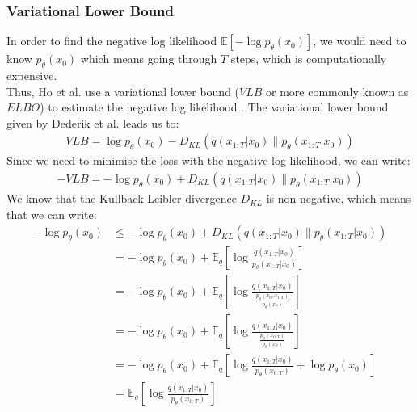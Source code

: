 \documentclass{article}
\begin{document}
\subsubsection{Variational Lower Bound}
In order to find the negative log likelihood $\mathbb{E}\left[- \log p_{\theta} \left(x_0\right)\right]$, we would need to know $p_{\theta} (x_0)$ which means going through $T$ steps, which is computationally expensive. \\
Thus, Ho et al. \cite{ho2020denoising} use a variational lower bound ($VLB$ or more commonly known as $ELBO$) to estimate the negative log likelihood \cite{ho2020denoising,sohldickstein2015deep}.
The variational lower bound given by Dederik et al. \cite{kingma2022autoencoding} leads us to:
\begin{gather}
  VLB = \log p_{\theta}\left(x_0\right) - D_{KL}\left(q\left(x_{1:T}|x_0\right) \| p_{\theta}\left(x_{1:T}|x_0\right)\right)
\end{gather}
Since we need to minimise the loss with the negative log likelihood, we can write:
\begin{gather}
  - VLB = - \log p_{\theta}\left(x_0\right) + D_{KL}\left(q\left(x_{1:T}|x_0\right) \| p_{\theta}\left(x_{1:T}|x_0\right)\right)
\end{gather}
We know that the Kullback-Leibler divergence $D_{KL}$ is non-negative, which means that we can write:
\begin{align}
  - \log p_{\theta}\left(x_0\right) &\leq - \log p_{\theta}\left(x_0\right) + D_{KL}\left(q\left(x_{1:T}|x_0\right) \| p_{\theta}\left(x_{1:T}|x_0\right)\right) \\[10pt]
  &= - \log p_{\theta}\left(x_0\right) + \mathbb{E}_q \left[\log \frac{q\left(x_{1:T}|x_0\right)}{p_{\theta}\left(x_{1:T}|x_0\right)}\right] \\[10pt]
  &= - \log p_{\theta}\left(x_0\right) + \mathbb{E}_q \left[\log \frac{q\left(x_{1:T}|x_0\right)}{\frac{p_{\theta}\left(x_0, x_{1:T}\right)}{p_{\theta}\left(x_0\right)}}\right] \\[10pt]
  &= - \log p_{\theta}\left(x_0\right) + \mathbb{E}_q \left[\log \frac{q\left(x_{1:T}|x_0\right)}{\frac{p_{\theta}\left(x_{0:T}\right)}{p_{\theta}\left(x_0\right)}}\right] \\[10pt]
  &= - \log p_{\theta}\left(x_0\right) + \mathbb{E}_q \left[\log \frac{q\left(x_{1:T}|x_0\right)}{p_{\theta}\left(x_{0:T}\right)} + \log {p_{\theta}\left(x_0\right)}\right] \\[10pt]
  &= \mathbb{E}_q \left[\log \frac{q\left(x_{1:T}|x_0\right)}{p_{\theta}\left(x_{0:T}\right)}\right]
\end{align}
\end{document}
